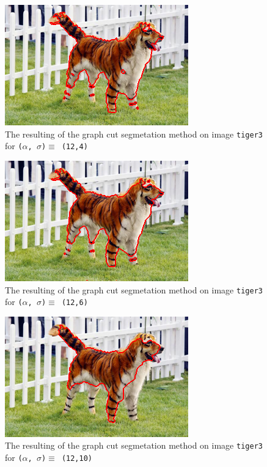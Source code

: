 {  \begin{minipage}{0.45\linewidth}
    \begin{figure}[H]
      \includegraphics[scale=0.5]{./images/04/Q11/var_a_b/tiger3/graphcut2_a12_s4.png}
      \caption{The resulting of the graph cut segmetation method on image \texttt{tiger3} for
        \texttt{($\alpha$, $\sigma$)$ \equiv$ (12,4)}}
      \label{fig:04_tiger32_a12_s4}
    \end{figure}
    \vfill
    \begin{figure}[H]
      \includegraphics[scale=0.5]{./images/04/Q11/var_a_b/tiger3/graphcut2_a12_s6.png}
      \caption{The resulting of the graph cut segmetation method on image \texttt{tiger3} for
        \texttt{($\alpha$, $\sigma$)$ \equiv$ (12,6)}}
      \label{fig:04_tiger32_a12_s6}
    \end{figure}
    \vfill
    \begin{figure}[H]
      \includegraphics[scale=0.5]{./images/04/Q11/var_a_b/tiger3/graphcut2_a12_s10.png}
      \caption{The resulting of the graph cut segmetation method on image \texttt{tiger3} for
        \texttt{($\alpha$, $\sigma$)$ \equiv$ (12,10)}}
      \label{fig:04_tiger32_a12_s10}
    \end{figure}
  \end{minipage}
}

